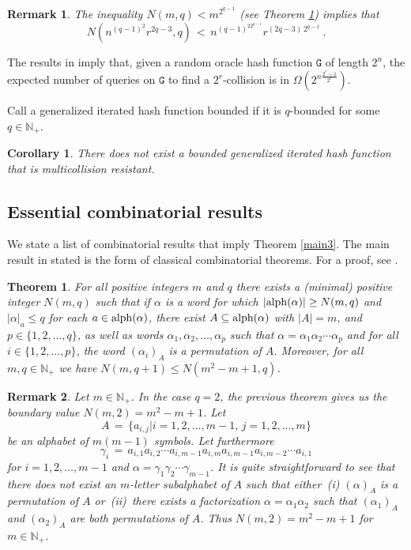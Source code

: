 \documentclass[submission,copyright,creativecommons]{eptcs}
\newcommand{\N}{\mathbb N}
\newcommand{\alp}{{\rm alph}}
\newcommand{\g}{\mathtt G}
\newtheorem{theorem}{Theorem}
\newtheorem{remark}{Rermark}
\newtheorem{corollary}{Corollary}
\begin{document}
\begin{remark}
The inequality $N(m,q)<m^{2^{q-1}}$ (see Theorem \ref{main1}) implies that $$N(n^{(q-1)^2}r^{2q-3},q)\,<\,n^{(q-1)^22^{q-1}}r^{(2q-3)\,2^{q-1}}\ .$$ 
\end{remark}

The results in \cite{STKT} imply that, given a random oracle hash function $\g$ of length $2^n$, the expected number of queries on $\g$ to find a $2^r$-collision is in $\Omega(2^{n\frac{2^r-1}{2^r}})$. 

Call a generalized iterated hash function bounded if it is $q$-bounded for some $q\in\N_+$. 

\begin{corollary}
There does not exist a bounded generalized iterated hash function that is multicollision resistant.
\end{corollary}

\subsection{Essential combinatorial results}

We state a list of combinatorial results that imply Theorem \ref{main3}. The main result in stated is the form of classical combinatorial theorems. For a proof, see \cite{KKV}.  

\begin{theorem} \label{main1}
For all positive integers  $m$ and $q$ there exists a (minimal) positive integer $N(m,q)$ such that if $\alpha$ is a word
for which $|\alp(\alpha)|\geq N(m,q)$ and $|\alpha|_a\le q$ for
each $a\in \alp(\alpha)$, there exist $A\subseteq \alp(\alpha)$
with $|A|=m$, and $p\in\{1,2,\ldots, q\}$, as well as words
$\alpha_1, \alpha_2, \ldots, \alpha_p$ such that $\alpha = \alpha_1
\alpha_2 \cdots \alpha_p$ and for all $i\in\{1,2, \ldots, p\}$, the word $(\alpha_i)_A$ is a permutation of $A$. Moreover, for all $m,q\in\N_+$ we have $N(m,q+1)\leq N(m^2-m+1,q)$.
\end{theorem}


\begin{remark} \label{rem1}
Let $m\in\N_+$. In the case $q=2$, the previous theorem gives us the boundary value $N(m,2)=m^2-m+1$. Let 
\[
A\,=\,\{a_{i,j}|i=1,2,\ldots,m-1,\,j=1,2,\ldots,m\}
\]
be an alphabet of $m(m-1)$ symbols. Let furthermore 
\[
\gamma_i\,=\,a_{i,1}a_{i,2}\cdots a_{i,m-1}a_{i,m}a_{i,m-1}a_{i,m-2}\cdots a_{i,1}
\]
for $i=1,2,\ldots,m-1$ and $\alpha=\gamma_1\gamma_2\cdots\gamma_{m-1}$. It is quite straightforward to see that there does not exist an $m$-letter subalphabet of $A$ such that either\, (i) $(\alpha)_A$ is a permutation of $A$ or\  \hbox{(ii) there} exists a factorization $\alpha=\alpha_1\alpha_2$ such that $(\alpha_1)_A$ and $(\alpha_2)_A$ are both permutations of $A$. Thus $N(m,2)=m^2-m+1$ for $m\in\N_+$. 
\end{remark}
\end{document}
